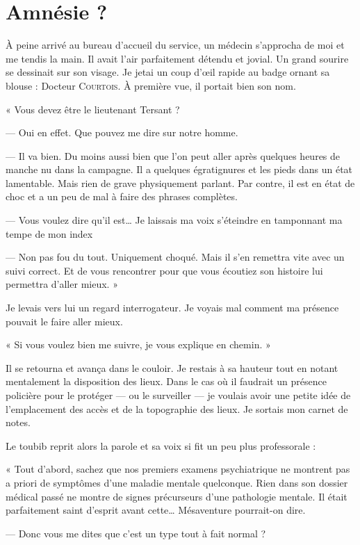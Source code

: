 \chapter{Amnésie ?}

À peine arrivé au bureau d'accueil du service, un médecin s'approcha de moi et me tendis la main.
Il avait l'air parfaitement détendu et jovial. Un grand sourire se dessinait sur son visage. Je jetai un coup d'œil
rapide au badge ornant sa blouse : Docteur \textsc{Courtois}. À première vue, il portait bien son nom.

« Vous devez être le lieutenant Tersant ?

— Oui en effet. Que pouvez me dire sur notre homme.

— Il va bien. Du moins aussi bien que l'on peut aller après quelques heures de manche nu dans la campagne. Il a
quelques égratignures et les pieds dans un état lamentable. Mais rien de grave physiquement parlant. Par contre, il est
en état de choc et a un peu de mal à faire des phrases complètes.

— Vous voulez dire qu'il est… Je laissais ma voix s'éteindre en tamponnant ma tempe de mon index

— Non pas fou du tout. Uniquement choqué. Mais il s'en remettra vite avec un suivi correct. Et de vous rencontrer pour
que vous écoutiez son histoire lui permettra d'aller mieux. »

Je levais vers lui un regard interrogateur. Je voyais mal comment ma présence pouvait le faire aller mieux.

« Si vous voulez bien me suivre, je vous explique en chemin. »

Il se retourna et avança dans le couloir. Je restais à sa hauteur tout en notant mentalement la disposition des lieux.
Dans le cas où il faudrait un présence policière pour le protéger — ou le surveiller — je voulais avoir une petite idée
de l'emplacement des accès et de la topographie des lieux. Je sortais mon carnet de notes.

Le toubib reprit alors la parole et sa voix si fit un peu plus professorale :

« Tout d'abord, sachez que nos premiers examens psychiatrique ne montrent pas a priori de symptômes d'une maladie
mentale quelconque. Rien dans son dossier médical passé ne montre de signes précurseurs d'une pathologie mentale. Il
était parfaitement saint d'esprit avant cette… Mésaventure pourrait-on dire.

— Donc vous me dites que c'est un type tout à fait normal ?

